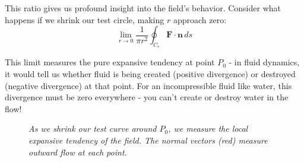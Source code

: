 \noindent This ratio gives us profound insight into the field's behavior. Consider what happens if we shrink our test circle, making $r$ approach zero:
\[
\lim_{r \to 0} \frac{1}{\pi r^2} \oint_{C_r} \mathbf{F} \cdot \mathbf{n}\,ds
\]

\noindent This limit measures the pure expansive tendency at point $P_0$ - in fluid dynamics, it would tell us whether fluid is being created (positive divergence) or destroyed (negative divergence) at that point. For an incompressible fluid like water, this divergence must be zero everywhere - you can't create or destroy water in the flow! \\

\begin{figure}[H]
\centering
{}
\caption{\textit{As we shrink our test curve around $P_0$, we measure the local expansive tendency of the field. The normal vectors (red) measure outward flow at each point.}}
\label{fig:shrinking_divergence}
\end{figure}

